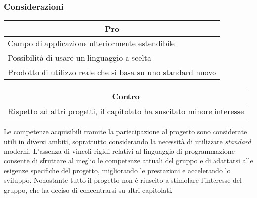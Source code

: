 \subsubsection{Considerazioni}
\begin{minipage}[t]{0.45\linewidth}
    \vspace{0pt}
    {\renewcommand{\arraystretch}{1.5}
    \begin{tabular}{p{1\linewidth}}
        \multicolumn{1}{c}{\textbf{Pro}} \\
        \midrule
        Campo di applicazione ulteriormente estendibile \\
        Possibilità di usare un linguaggio a scelta     \\
        Prodotto di utilizzo reale che si basa su uno standard nuovo \\
        \hline
    \end{tabular}
    }
\end{minipage}
\hspace{0.05\linewidth}
\begin{minipage}[t]{0.45\linewidth}
    \vspace{0pt}
    {\renewcommand{\arraystretch}{1.5}
    \begin{tabular}{p{1\linewidth}}
        \multicolumn{1}{c}{\textbf{Contro}} \\
        \midrule
        Rispetto ad altri progetti, il capitolato ha suscitato minore interesse \\
        \hline
    \end{tabular}
    }
\end{minipage}
\vspace{1em}

\noindent
Le competenze acquisibili tramite la partecipazione al progetto sono considerate utili in diversi ambiti, soprattutto considerando la necessità di utilizzare \textit{standard} moderni.
L'assenza di vincoli rigidi relativi al linguaggio di programmazione consente di sfruttare al meglio le competenze attuali del gruppo e di adattarsi alle esigenze specifiche del progetto, migliorando le prestazioni e accelerando lo sviluppo.
Nonostante tutto il progetto non è riuscito a stimolare l'interesse del gruppo, che ha deciso di concentrarsi su altri capitolati.
